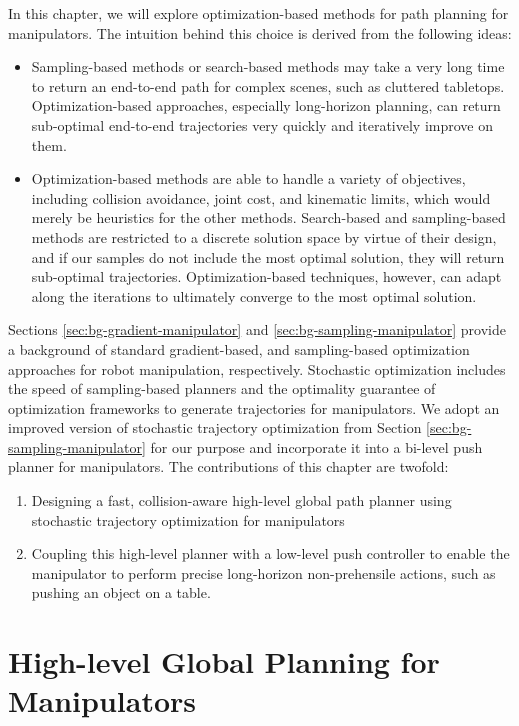 In this chapter, we will explore optimization-based methods for path planning for manipulators. The intuition behind this choice is derived from the following ideas:
\begin{itemize}
    \item Sampling-based methods or search-based methods may take a very long time to return an end-to-end path for complex scenes, such as cluttered tabletops. Optimization-based approaches, especially long-horizon planning, can return sub-optimal end-to-end trajectories very quickly and iteratively improve on them.
    \item Optimization-based methods are able to handle a variety of objectives, including collision avoidance, joint cost, and kinematic limits, which would merely be heuristics for the other methods. Search-based and sampling-based methods are restricted to a discrete solution space by virtue of their design, and if our samples do not include the most optimal solution, they will return sub-optimal trajectories. Optimization-based techniques, however, can adapt along the iterations to ultimately converge to the most optimal solution.
\end{itemize}

Sections \ref{sec:bg-gradient-manipulator} and \ref{sec:bg-sampling-manipulator} provide a background of standard gradient-based, and sampling-based optimization approaches for robot manipulation, respectively. Stochastic optimization includes the speed of sampling-based planners and the optimality guarantee of optimization frameworks to generate trajectories for manipulators. We adopt an improved version of stochastic trajectory optimization from Section \ref{sec:bg-sampling-manipulator} for our purpose and incorporate it into a bi-level push planner for manipulators. The contributions of this chapter are twofold:

\begin{enumerate}
    \item Designing a fast, collision-aware high-level global path planner using stochastic trajectory optimization for manipulators
    \item Coupling this high-level planner with a low-level push controller to enable the manipulator to perform precise long-horizon non-prehensile actions, such as pushing an object on a table.
\end{enumerate}

\section{High-level Global Planning for Manipulators}

